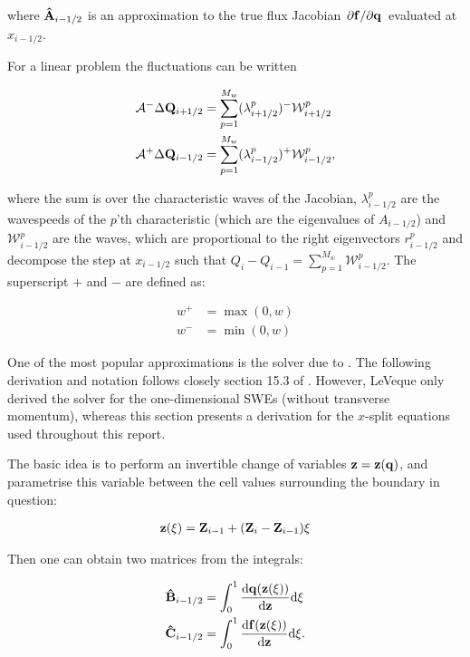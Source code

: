 where $\vu A_{i-1/2}$ is an approximation to the true flux Jacobian $\pdv*{\vb f}{\vb q}$ evaluated at $x_{i-1/2}$.

For a linear problem the fluctuations can be written

\begin{subequations}
  \label{eq:approx_fluct}
\begin{align}
  \mathcal{A}^- \Delta \vb Q_{i+1/2} &= \sum_{p=1}^{M_w} (\lambda_{i+1/2}^p)^- \mathcal{W}_{i+1/2}^p \\
  \mathcal{A}^+ \Delta \vb Q_{i-1/2} &= \sum_{p=1}^{M_w} (\lambda_{i-1/2}^p)^+ \mathcal{W}_{i-1/2}^p,
\end{align}
\end{subequations}

where the sum is over the characteristic waves of the Jacobian, $\lambda_{i-1/2}^p$ are the wavespeeds of the $p$'th characteristic (which are the eigenvalues of $A_{i-1/2}$) and $\mathcal{W}_{i-1/2}^p$ are the waves, which are proportional to the right eigenvectors $r_{i-1/2}^p$ and decompose the step at $x_{i-1/2}$ such that $Q_i - Q_{i-1} = \sum_{p=1}^{M_w} \mathcal{W}_{i-1/2}^p$. The superscript $+$ and $-$ are defined as:

\begin{align}
  w^+ &= \max(0, w) \\
  w^- &= \min(0, w)
\end{align}

One of the most popular approximations is the solver due to \citet{roe1981approximate}. The following derivation and notation follows closely section 15.3 of \citet{leveque2002finite}. However, LeVeque only derived the solver for the one-dimensional SWEs (without transverse momentum), whereas this section presents a derivation for the $x$-split equations used throughout this report.

The basic idea is to perform an invertible change of variables $\vb z = \vb z(\vb q)$, and parametrise this variable between the cell values surrounding the boundary in question:

\begin{align}
  \vb z(\xi) = \vb Z_{i-1} + (\vb Z_i - \vb Z_{i-1})\xi
\end{align}

Then one can obtain two matrices from the integrals:

\begin{subequations}
  \label{eq:roe_integrals}
  \begin{align}
    \vu B_{i-1/2} &= \int_0^1 \dv{\vb q(\vb z(\xi))}{\vb z} \dd \xi \\
    \vu C_{i-1/2} &= \int_0^1 \dv{\vb f(\vb z(\xi))}{\vb z} \dd \xi.
  \end{align}
\end{subequations}

